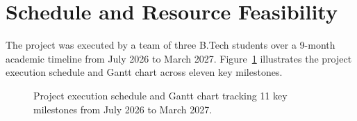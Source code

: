 \documentclass[12pt,a4paper]{report}
\begin{document}
\section{Schedule and Resource Feasibility}
The project was executed by a team of three B.Tech students over a 9-month academic timeline from July 2026 to March 2027. Figure~\ref{fig:project_gantt} illustrates the project execution schedule and Gantt chart across eleven key milestones.

\begin{figure}[H]
    \centering
    \caption{Project execution schedule and Gantt chart tracking 11 key milestones from July 2026 to March 2027.}
    \label{fig:project_gantt}
\end{figure}
\end{document}
